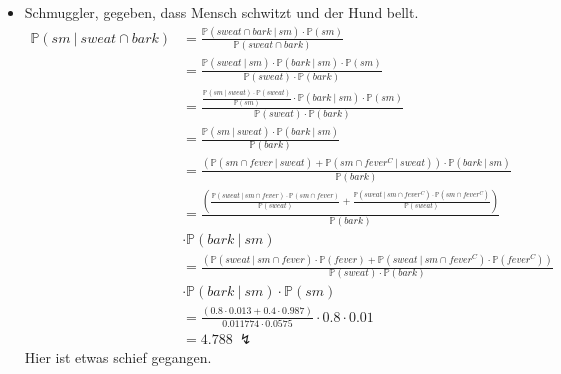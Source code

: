 \documentclass[a4paper]{scrartcl}
\newcommand{\prob}{\mathbb{P}}
\begin{document}
\begin{itemize}
    \item Schmuggler, gegeben, dass Mensch schwitzt und der Hund bellt.
        \begin{equation*}
            \begin{split}
                \prob(sm\ |\ sweat \cap bark)
                &= \frac{\prob(sweat \cap bark\ |\ sm) \cdot \prob(sm)}
                        {\prob(sweat \cap bark)} \\
                &= \frac{\prob(sweat\ |\ sm) \cdot \prob(bark\ |\ sm) \cdot
                   \prob(sm)}{\prob(sweat) \cdot \prob(bark)} \\
                &= \frac{\frac{\prob(sm\ |\ sweat) \cdot \prob(sweat)}
                              {\prob(sm)}
                         \cdot \prob(bark\ |\ sm) \cdot \prob(sm)}
                        {\prob(sweat) \cdot \prob(bark)} \\
                &= \frac{\prob(sm\ |\ sweat) \cdot \prob(bark\ |\ sm)}
                        {\prob(bark)} \\
                &= \frac{(\prob(sm \cap fever\ |\ sweat) +
                          \prob(sm \cap fever^C\ |\ sweat)) \cdot
                         \prob(bark\ |\ sm)}
                        {\prob(bark)} \\
                &= \frac{(\frac{\prob(sweat\ |\ sm \cap fever) \cdot \prob(sm \cap fever)}{\prob(sweat)} +
                          \frac{\prob(sweat\ |\ sm \cap fever^C) \cdot \prob(sm \cap fever^C)}{\prob(sweat)})}
                        {\prob(bark)} \\
                &\cdot \prob(bark\ |\ sm) \\
                &= \frac{(\prob(sweat\ |\ sm \cap fever) \cdot \prob(fever) +
                          \prob(sweat\ |\ sm \cap fever^C) \cdot \prob(fever^C))}
                          {\prob(sweat) \cdot \prob(bark)} \\
                &\cdot \prob(bark\ |\ sm) \cdot \prob(sm)\\
                &= \frac{(\num{0,8} \cdot \num{0,013} + \num{0,4} \cdot \num{0,987})}
                        {\num{0,011774} \cdot \num{0,0575}}
                   \cdot \num{0,8} \cdot \num{0,01} \\
                &= \num{4,788}\ \lightning
            \end{split}
        \end{equation*}
        Hier ist etwas schief gegangen.
\end{itemize}
\end{document}
